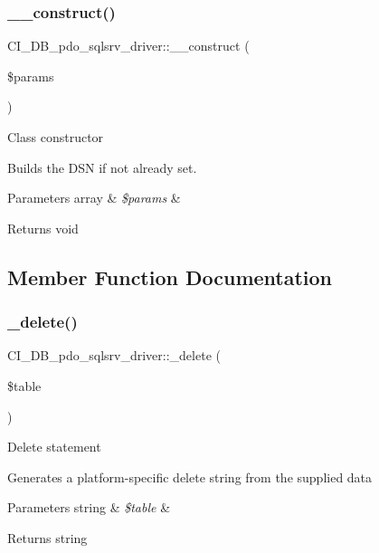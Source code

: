 \subsubsection{\texorpdfstring{\+\_\+\+\_\+construct()}{\_\_construct()}}
{\footnotesize\ttfamily C\+I\+\_\+\+D\+B\+\_\+pdo\+\_\+sqlsrv\+\_\+driver\+::\+\_\+\+\_\+construct (\begin{DoxyParamCaption}\item[{}]{\$params }\end{DoxyParamCaption})}

Class constructor

Builds the D\+SN if not already set.


\begin{DoxyParams}[1]{Parameters}
array & {\em \$params} & \\
\hline
\end{DoxyParams}
\begin{DoxyReturn}{Returns}
void 
\end{DoxyReturn}


\subsection{Member Function Documentation}
\mbox{\label{class_c_i___d_b__pdo__sqlsrv__driver_a64b0bb018323b24fae99f0e3bdf054bc}} 
\subsubsection{\texorpdfstring{\+\_\+delete()}{\_delete()}}
{\footnotesize\ttfamily C\+I\+\_\+\+D\+B\+\_\+pdo\+\_\+sqlsrv\+\_\+driver\+::\+\_\+delete (\begin{DoxyParamCaption}\item[{}]{\$table }\end{DoxyParamCaption})\hspace{0.3cm}{\ttfamily [protected]}}

Delete statement

Generates a platform-\/specific delete string from the supplied data


\begin{DoxyParams}[1]{Parameters}
string & {\em \$table} & \\
\hline
\end{DoxyParams}
\begin{DoxyReturn}{Returns}
string 
\end{DoxyReturn}
\mbox{\label{class_c_i___d_b__pdo__sqlsrv__driver_a0d2a256e1314da50ecfd51815e6054c2}} 
